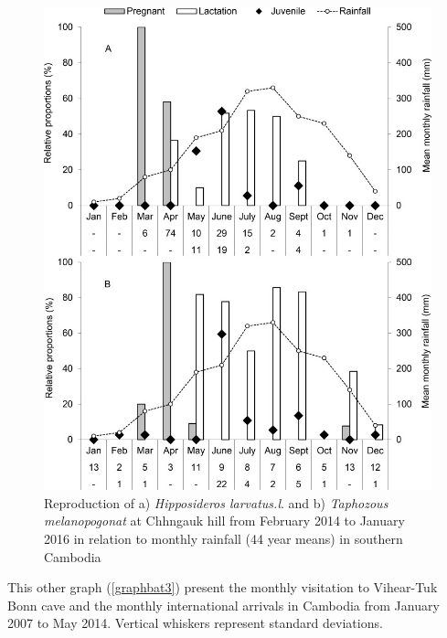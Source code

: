 \documentclass[draft, final]{report}
\begin{document}
\begin{figure}[!ht]
  \centering
  \includegraphics[scale=4.5]{LateX/Images/batreproductioncambodgia2.png}
  \caption{Reproduction of a) \emph{Hipposideros larvatus.l}. and b) \emph{Taphozous melanopogonat} at Chhngauk hill from February 2014 to January 2016 in relation to monthly rainfall (44 year means) in southern Cambodia\cite{graph2batpopulation}\label{graphbat2}}
\end{figure}
\clearpage
This other graph (\ref{graphbat3}) present the monthly visitation to Vihear-Tuk Bonn cave and the monthly international arrivals in Cambodia from January 2007 to May 2014.
Vertical whiskers represent standard deviations. \\
\par
\end{document}
